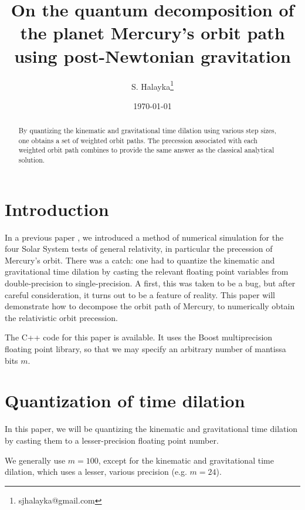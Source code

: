 \documentclass[12pt]{article}
\title{On the quantum decomposition of the planet Mercury's orbit path using post-Newtonian gravitation}
\author{S. Halayka\footnote{sjhalayka@gmail.com}}
\date{\today\;\currenttime}
\begin{document}
 
\maketitle

\begin{abstract}
By quantizing the kinematic and gravitational time dilation using various step sizes, one obtains a set of weighted orbit paths.
The precession associated with each weighted orbit path combines to provide the same answer as the classical analytical solution.
\end{abstract}





\section{Introduction}

In a previous paper \cite{halayka}, we introduced a method of numerical simulation for the four Solar System tests of general relativity, in particular the precession of Mercury's orbit.
There was a catch: one had to quantize the kinematic and gravitational time dilation by casting the relevant floating point variables from double-precision to single-precision.
A first, this was taken to be a bug, but after careful consideration, it turns out to be a feature of reality.
This paper will demonstrate how to decompose the orbit path of Mercury, to numerically obtain the relativistic orbit precession.

The C++ code for this paper is available.
It uses the Boost multiprecision floating point library, so that we may specify an arbitrary number of mantissa bits $m$.


\section{Quantization of time dilation}

In this paper, we will be quantizing the kinematic and gravitational time dilation by casting them to a lesser-precision floating point number.

We generally use $m = 100$, except for the kinematic and gravitational time dilation, which uses a lesser, various precision (e.g. $m = 24$).

\end{document}
